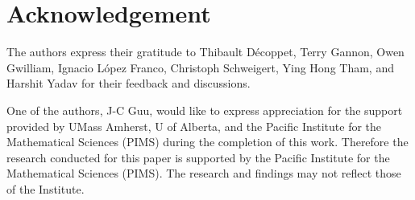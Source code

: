 \section*{Acknowledgement}

The authors express their gratitude to Thibault Décoppet, Terry Gannon, Owen
Gwilliam, Ignacio L\'{o}pez Franco, Christoph Schweigert, Ying Hong Tham, and Harshit Yadav for their
feedback and discussions.

One of the authors, J-C Guu, would like to express appreciation for the support
provided by UMass Amherst, U of Alberta, and the Pacific Institute for the
Mathematical Sciences (PIMS) during the completion of this work.
Therefore the research conducted for this paper is supported by the Pacific Institute for the
Mathematical Sciences (PIMS). The research and findings may not reflect those of the Institute.
